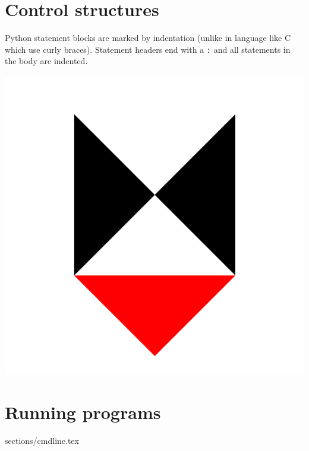 \documentclass{../refsheet}
\begin{document}
\section{Control structures}
Python statement blocks are marked by indentation (unlike in language
like C which use curly braces). Statement headers end with a
\texttt{:} and all statements in the body are indented.






\begin{center}
\includegraphics[scale=0.02]{../images/lycaeum-logo.png}
\end{center}
\section{Running programs}
 {sections/cmdline.tex}
\end{document}
